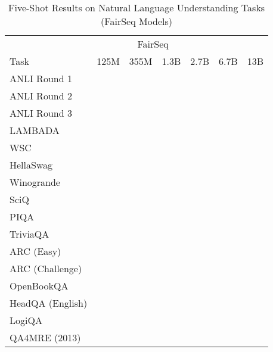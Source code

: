 \documentclass[11pt]{article}
\begin{document}
{\begin{landscape}
\begin{table*}
\centering \begin{tabular}{l c c c c c c } \\ 
& \multicolumn{4}{c}{FairSeq} \\ 
Task & 125M & 355M & 1.3B & 2.7B & 6.7B & 13B \\ \toprule
ANLI Round 1 &  &  &  &  &  &  \\ 
ANLI Round 2 &  &  &  &  &  &  \\ 
ANLI Round 3 &  &  &  &  &  &  \\ 
LAMBADA &  &  &  &  &  &  \\ 
WSC &  &  &  &  &  &  \\ 
HellaSwag &  &  &  &  &  &  \\ 
Winogrande &  &  &  &  &  &  \\ 
SciQ &  &  &  &  &  &  \\ 
PIQA &  &  &  &  &  &  \\ 
TriviaQA &  &  &  &  &  &  \\ 
ARC (Easy) &  &  &  &  &  &  \\ 
ARC (Challenge) &  &  &  &  &  &  \\ 
OpenBookQA &  &  &  &  &  &  \\ 
HeadQA (English) &  &  &  &  &  &  \\ 
LogiQA &  &  &  &  &  &  \\ 
QA4MRE (2013) &  &  &  &  &  &  \\ 
\bottomrule 
\end{tabular}
\caption{Five-Shot Results on Natural Language Understanding Tasks (FairSeq Models)}
\label{tab:nlu_fairseq_5}
\end{table*}




\end{landscape}}
\end{document}
